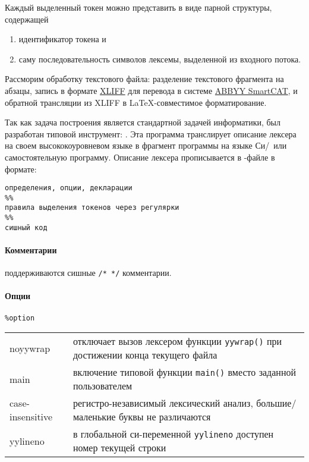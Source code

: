 \bigskip
Каждый выделенный токен можно представить в виде парной структуры,
содержащей
\begin{enumerate}
  \item идентификатор токена и
  \item саму последовательность символов лексемы, выделенной из входного
потока.
\end{enumerate}

\bigskip
Рассморим обработку текстового файла: разделение текстового фрагмента на абзацы,
запись в формате
\href{http://docs.oasis-open.org/xliff/xliff-core/xliff-core.html}{XLIFF} для
перевода в системе \href{http://smartcat.pro}{ABBYY SmartCAT}, и обратной
трансляции из XLIFF в \LaTeX-совместимое форматирование.

\bigskip
Так как задача построения  является стандартной задачей информатики, был разработан типовой
инструмент:  . Эта программа
транслирует описание лексера на своем высококоуровневом языке в фрагмент
программы на языке Си/\cpp\ или самостоятельную программу. Описание лексера
прописывается в -файле в формате:

\begin{verbatim}
определения, опции, декларации
%%
правила выделения токенов через регулярки
%%
сишный код
\end{verbatim}

\paragraph{Комментарии} поддерживаются сишные \verb|/* */| комментарии.

\paragraph{Опции} \verb|%option|

\bigskip\noindent
\begin{tabular}{l l}
noyywrap & отключает вызов лексером функции \verb|yywrap()| при достижении
конца текущего файла \\
main & включение типовой функции \verb|main()| вместо заданной пользователем \\
case-insensitive & регистро-независимый лексический анализ, большие/маленькие
буквы не различаются \\
yylineno & в глобальной си-переменной \verb|yylineno| доступен номер
текущей строки \\
\end{tabular}

